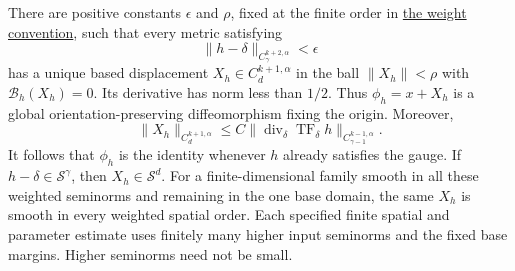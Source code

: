 \documentclass[
  english,
  11pt,
  reqno]{amsart}
\begin{document}
There are positive constants \(\epsilon\) and \(\rho\), fixed at the
finite order in \hyperref[eq:online-gauge-fixed-weights]{the weight
convention}, such that every metric satisfying%
 \[
\|h-\delta\|_{C^{k+2,\alpha}_\gamma}<\epsilon
\] has a unique based displacement \(X_h\in C^{k+1,\alpha}_d\) in the
ball \(\|X_h\|<\rho\) with \(\mathcal B_h(X_h)=0\). Its derivative has
norm less than \(1/2\). Thus \(\phi_h=x+X_h\) is a global
orientation-preserving diffeomorphism fixing the origin. Moreover,%
 \[
\|X_h\|_{C^{k+1,\alpha}_d}
\le C\|\operatorname{div}_\delta\operatorname{TF}_\delta h
       \|_{C^{k-1,\alpha}_{\gamma-1}}.
\] It follows that \(\phi_h\) is the identity whenever \(h\) already
satisfies the gauge. If \(h-\delta\in\mathscr S^\gamma\), then
\(X_h\in\mathscr S^d\). For a finite-dimensional family smooth in all
these weighted seminorms and remaining in the one base domain, the same
\(X_h\) is smooth in every weighted spatial order. Each specified finite
spatial and parameter estimate uses finitely many higher input seminorms
and the fixed base margins. Higher seminorms need not be small.
\end{document}
